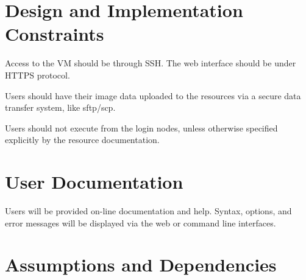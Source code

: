 \documentclass{scrreprt}
\begin{document}
\section{Design and Implementation Constraints}
\iffalse
$<$Describe any items or issues that will limit the options available to the 
developers. These might include: corporate or regulatory policies; hardware 
limitations (timing requirements, memory requirements); interfaces to other 
applications; specific technologies, tools, and databases to be used; parallel 
operations; language requirements; communications protocols; security 
considerations; design conventions or programming standards (for example, if the 
customer’s organization will be responsible for maintaining the delivered 
software).$>$
\fi

Access to the VM should be through SSH. The web interface should be under HTTPS 
protocol.

Users should have their image data uploaded to the resources via a secure data 
transfer system, like sftp/scp.

Users should not execute from the login nodes, unless otherwise specified explicitly 
by the resource documentation.

\section{User Documentation}
\iffalse
$<$List the user documentation components (such as user manuals, on-line help, 
and tutorials) that will be delivered along with the software. Identify any 
known user documentation delivery formats or standards.$>$
\fi
Users will be provided on-line documentation and help.  Syntax, options, and error
messages will be displayed via the web or command line interfaces.

\section{Assumptions and Dependencies}
\iffalse
$<$List any assumed factors (as opposed to known facts) that could affect the 
requirements stated in the SRS. These could include third-party or commercial 
components that you plan to use, issues around the development or operating 
environment, or constraints. The project could be affected if these assumptions 
are incorrect, are not shared, or change. Also identify any dependencies the 
project has on external factors, such as software components that you intend to 
reuse from another project, unless they are already documented elsewhere (for 
example, in the vision and scope document or the project plan).$>$
\fi
\end{document}
